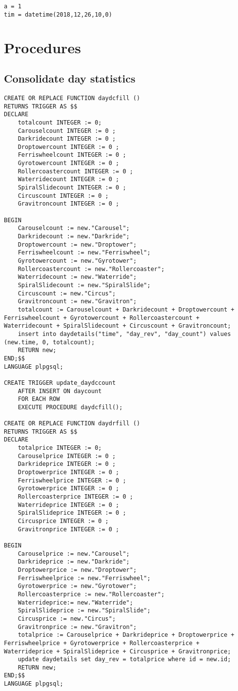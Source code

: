 \begin{lstlisting}
a = 1
tim = datetime(2018,12,26,10,0)
\end{lstlisting}

\section{Procedures}
\subsection{Consolidate day statistics}
\begin{lstlisting}
CREATE OR REPLACE FUNCTION daydcfill ()
RETURNS TRIGGER AS $$
DECLARE
    totalcount INTEGER := 0;
    Carouselcount INTEGER := 0 ;
    Darkridecount INTEGER := 0 ;
    Droptowercount INTEGER := 0 ;
    Ferriswheelcount INTEGER := 0 ;
    Gyrotowercount INTEGER := 0 ;
    Rollercoastercount INTEGER := 0 ;
    Waterridecount INTEGER := 0 ;
    SpiralSlidecount INTEGER := 0 ;
    Circuscount INTEGER := 0 ;
    Gravitroncount INTEGER := 0 ;

BEGIN
    Carouselcount := new."Carousel";
    Darkridecount := new."Darkride";
    Droptowercount := new."Droptower";
    Ferriswheelcount := new."Ferriswheel";
    Gyrotowercount := new."Gyrotower";
    Rollercoastercount := new."Rollercoaster";
    Waterridecount := new."Waterride";
    SpiralSlidecount := new."SpiralSlide";
    Circuscount := new."Circus";
    Gravitroncount := new."Gravitron";
    totalcount := Carouselcount + Darkridecount + Droptowercount + Ferriswheelcount + Gyrotowercount + Rollercoastercount + Waterridecount + SpiralSlidecount + Circuscount + Gravitroncount;
    insert into daydetails("time", "day_rev", "day_count") values (new.time, 0, totalcount);
    RETURN new;
END;$$
LANGUAGE plpgsql;

CREATE TRIGGER update_daydccount
    AFTER INSERT ON daycount
    FOR EACH ROW
    EXECUTE PROCEDURE daydcfill();

CREATE OR REPLACE FUNCTION daydrfill ()
RETURNS TRIGGER AS $$
DECLARE
    totalprice INTEGER := 0;
    Carouselprice INTEGER := 0 ;
    Darkrideprice INTEGER := 0 ;
    Droptowerprice INTEGER := 0 ;
    Ferriswheelprice INTEGER := 0 ;
    Gyrotowerprice INTEGER := 0 ;
    Rollercoasterprice INTEGER := 0 ;
    Waterrideprice INTEGER := 0 ;
    SpiralSlideprice INTEGER := 0 ;
    Circusprice INTEGER := 0 ;
    Gravitronprice INTEGER := 0 ;

BEGIN
    Carouselprice := new."Carousel";
    Darkrideprice := new."Darkride";
    Droptowerprice := new."Droptower";
    Ferriswheelprice := new."Ferriswheel";
    Gyrotowerprice := new."Gyrotower";
    Rollercoasterprice := new."Rollercoaster";
    Waterrideprice:= new."Waterride";
    SpiralSlideprice := new."SpiralSlide";
    Circusprice := new."Circus";
    Gravitronprice := new."Gravitron";
    totalprice := Carouselprice + Darkrideprice + Droptowerprice + Ferriswheelprice + Gyrotowerprice + Rollercoasterprice + Waterrideprice + SpiralSlideprice + Circusprice + Gravitronprice;
    update daydetails set day_rev = totalprice where id = new.id;
    RETURN new;
END;$$
LANGUAGE plpgsql;


\end{lstlisting}
